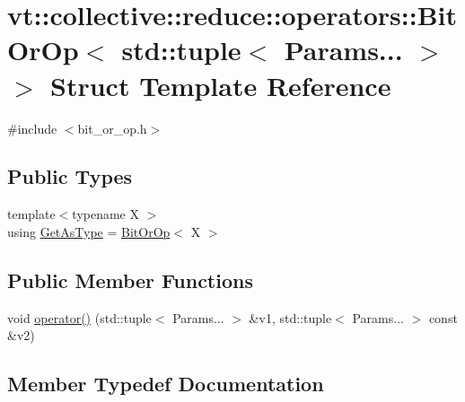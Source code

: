 \hypertarget{structvt_1_1collective_1_1reduce_1_1operators_1_1_bit_or_op_3_01std_1_1tuple_3_01_params_8_8_8_01_4_01_4}{}\section{vt\+:\+:collective\+:\+:reduce\+:\+:operators\+:\+:Bit\+Or\+Op$<$ std\+:\+:tuple$<$ Params... $>$ $>$ Struct Template Reference}
\label{structvt_1_1collective_1_1reduce_1_1operators_1_1_bit_or_op_3_01std_1_1tuple_3_01_params_8_8_8_01_4_01_4}


{\ttfamily \#include $<$bit\+\_\+or\+\_\+op.\+h$>$}

\subsection*{Public Types}
\begin{DoxyCompactItemize}
\item 
{\footnotesize template$<$typename X $>$ }\\using \hyperlink{structvt_1_1collective_1_1reduce_1_1operators_1_1_bit_or_op_3_01std_1_1tuple_3_01_params_8_8_8_01_4_01_4_aefef184eae9e53940ca2c9bd67dd2d68}{Get\+As\+Type} = \hyperlink{structvt_1_1collective_1_1reduce_1_1operators_1_1_bit_or_op}{Bit\+Or\+Op}$<$ X $>$
\end{DoxyCompactItemize}
\subsection*{Public Member Functions}
\begin{DoxyCompactItemize}
\item 
void \hyperlink{structvt_1_1collective_1_1reduce_1_1operators_1_1_bit_or_op_3_01std_1_1tuple_3_01_params_8_8_8_01_4_01_4_ab80a95c40163cb3358bfeb1b004068b7}{operator()} (std\+::tuple$<$ Params... $>$ \&v1, std\+::tuple$<$ Params... $>$ const \&v2)
\end{DoxyCompactItemize}


\subsection{Member Typedef Documentation}
\mbox{\label{structvt_1_1collective_1_1reduce_1_1operators_1_1_bit_or_op_3_01std_1_1tuple_3_01_params_8_8_8_01_4_01_4_aefef184eae9e53940ca2c9bd67dd2d68}} 
